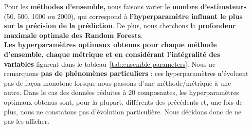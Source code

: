 \documentclass[12pt]{article}
\newcommand{\tabref}[1]{tableau~\ref{#1}}
\begin{document}
\begin{table}[H]
    \centering
    \caption{Paramètres optimaux pour le SVM}
    \label{tab:svm-parameters}
\end{table}

Pour les \textbf{méthodes d'ensemble,} nous faisons varier le \textbf{nombre
d'estimateurs} (50, 500, 1000 ou 2000), qui correspond à
\textbf{l'hyperparamètre influant le plus sur la précision de la prédiction}. De
plus, nous cherchons la \textbf{profondeur maximale optimale des Random
Forests}.  \\

\textbf{Les hyperparamètres optimaux obtenus pour chaque méthode d'ensemble,
chaque métrique et en considérant l'intégralité des variables} figurent dans le
\tabref{tab:ensemble-parameters}. Nous ne remarquons \textbf{pas de phénomènes
particuliers} : ces hyperparamètres n'évoluent pas de façon monotone lorsque
nous passons d'une méthode/métrique à une autre.  Dans le cas des données
réduites à 20 composantes, les hyperparamètres optimaux obtenus sont, pour la
plupart, différents des précédents et, une fois de plus, nous ne constatons pas
d'évolution particulière. Nous décidons donc de ne pas les afficher. \\

\begin{table}[H]
    \caption{Paramètres optimaux pour les méthodes d'ensemble (sans PCA)}
    \label{tab:ensemble-parameters}
\end{table}
\end{document}
